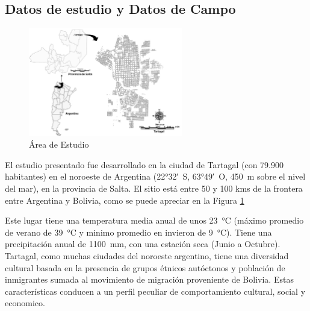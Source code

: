 \subsection{Datos de estudio y Datos de Campo}
  \begin{figure}[hbt]
  \centering%
  \includegraphics[width=0.6\textwidth]{images/tartagal}%
  \caption{Área de Estudio}\label{fig:tartagal}
  \end{figure}

  \par El estudio presentado fue desarrollado en la ciudad de Tartagal
    (con 79.900 habitantes) en el noroeste de Argentina
    (\ang{22;32;}~S, \ang{63;49;}~O, \SI{450}{\meter} sobre el nivel del mar),
    en la provincia de Salta. El sitio está entre 50 y 100 kms de la frontera
    entre Argentina y Bolivia, como se puede apreciar en la Figura \ref{fig:tartagal}

  \par Este lugar tiene una temperatura media anual de unos \SI{23}{\degreeCelsius}
    (máximo promedio de verano de \SI{39}{\degreeCelsius} y minimo promedio en
    invieron de \SI{9}{\degreeCelsius}). Tiene una precipitación anual de
    \SI{1100}{\milli\meter}, con una estación seca (Junio a Octubre).
    Tartagal, como muchas ciudades del noroeste argentino, tiene una diversidad
    cultural basada en la presencia de grupos étnicos autóctonos y población
    de inmigrantes sumada al movimiento de migración proveniente de Bolivia.
    Estas características conducen a un perfil peculiar de comportamiento
    cultural, social y economico.

